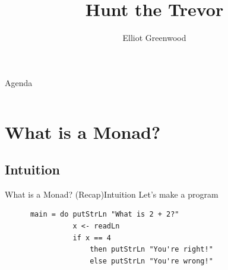 \documentclass{beamer}
\begin{document}
\title{Hunt the Trevor}
\author{Elliot Greenwood}
\date{}
  \begin{frame}[fragile]
    \titlepage%
  \end{frame}
  \begin{frame}{Agenda}
    \begin{columns}[t]
      \begin{column}{.4\textwidth}
        \tableofcontents[sections={1-2}]
      \end{column}
      \begin{column}{.4\textwidth}
        \tableofcontents[sections={3-5}]
      \end{column}
    \end{columns}
  \end{frame}
  \section{What is a Monad?}
  \subsection{Intuition}
  \begin{frame}[fragile]{What is a Monad? (Recap)}{Intuition}
    Let's make a program
    
    \begin{verbatim}
      main = do putStrLn "What is 2 + 2?"
                x <- readLn
                if x == 4
                    then putStrLn "You're right!"
                    else putStrLn "You're wrong!"
    \end{verbatim}
  \end{frame}
\end{document}
